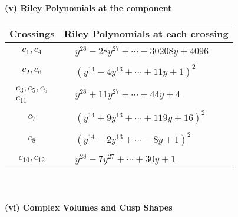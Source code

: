 \documentclass[1p]{elsarticle_modified}
\theoremstyle{definition}
\begin{document}
\newpage\renewcommand{\arraystretch}{1}
\flushleft \textbf{(v) Riley Polynomials at the component}\newline \\
\begin{tabular}{m{50pt}|m{274pt}}
Crossings & \hspace{64pt}Riley Polynomials at each crossing \\
\hline $$\begin{aligned}c_{1},c_{4}\end{aligned}$$&$\begin{aligned}
&y^{28}-28 y^{27}+\cdots-30208 y+4096
\end{aligned}$\\
\hline $$\begin{aligned}c_{2},c_{6}\end{aligned}$$&$\begin{aligned}
&(y^{14}-4 y^{13}+\cdots+11 y+1)^{2}
\end{aligned}$\\
\hline $$\begin{aligned}c_{3},c_{5},c_{9}\\c_{11}\end{aligned}$$&$\begin{aligned}
&y^{28}+11 y^{27}+\cdots+44 y+4
\end{aligned}$\\
\hline $$\begin{aligned}c_{7}\end{aligned}$$&$\begin{aligned}
&(y^{14}+9 y^{13}+\cdots+119 y+16)^{2}
\end{aligned}$\\
\hline $$\begin{aligned}c_{8}\end{aligned}$$&$\begin{aligned}
&(y^{14}-2 y^{13}+\cdots-8 y+1)^{2}
\end{aligned}$\\
\hline $$\begin{aligned}c_{10},c_{12}\end{aligned}$$&$\begin{aligned}
&y^{28}-7 y^{27}+\cdots+30 y+1
\end{aligned}$\\
\hline
\end{tabular}\\~\\
\newpage\flushleft \textbf{(vi) Complex Volumes and Cusp Shapes}
\end{document}
